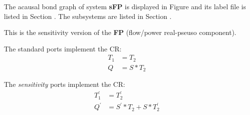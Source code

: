 

   The acausal bond graph of system \textbf{sFP} is
   displayed in Figure  and its label
   file is listed in Section .
   The subsystems are listed in Section .

This is the sensitivity version of the \textbf{FP} (flow/power
real-pseuso component).

The standard ports implement the CR:
\begin{align}
  T_1 &= T_2 \\
  Q &= S*T_2
\end{align}

The \emph{sensitivity} ports implement the CR:
\begin{align}
  T_1^\prime &= T_2^\prime \\
  Q^\prime &= S^\prime *T_2 + S*T_2^\prime
\end{align}

